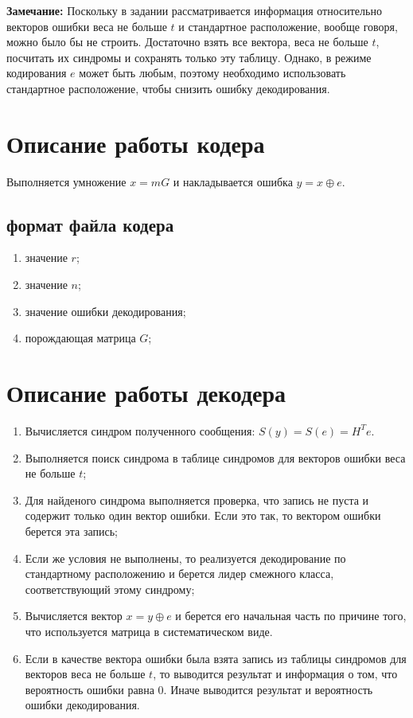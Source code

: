 \documentclass{article}
\begin{document}
\textbf{Замечание:}
Поскольку в задании рассматривается информация относительно векторов ошибки веса не больше $t$ и стандартное расположение, вообще говоря, можно было бы не строить.
Достаточно взять все вектора, веса не больше $t$, посчитать их синдромы и сохранять только эту таблицу.
Однако, в режиме кодирования $e$ может быть любым, поэтому необходимо использовать стандартное расположение, чтобы снизить ошибку декодирования.

\section{Описание работы кодера}

Выполняется умножение $x = mG$ и накладывается ошибка $y = x \oplus e$.

\subsection{формат файла кодера}

\begin{enumerate}
\item значение $r$;
\item значение $n$;
\item значение ошибки декодирования;
\item порождающая матрица $G$;
\end{enumerate}

\section{Описание работы декодера}

\begin{enumerate}
\item Вычисляется синдром полученного сообщения: $S(y) = S(e) = H^Te$.
\item Выполняется поиск синдрома в таблице синдромов для векторов ошибки веса не больше $t$;
\item Для найденого синдрома выполняется проверка, что запись не пуста и содержит только один вектор ошибки.
Если это так, то вектором ошибки берется эта запись;
\item Если же условия не выполнены, то реализуется декодирование по стандартному расположению и берется лидер смежного класса, соответствующий этому синдрому;
\item Вычисляется вектор $x = y \oplus e$ и берется его начальная часть по причине того, что используется матрица в систематическом виде.
\item Если в качестве вектора ошибки была взята запись из таблицы синдромов для векторов веса не больше $t$, то выводится результат и информация о том, что вероятность ошибки равна 0.
Иначе выводится результат и вероятность ошибки декодирования.
\end{enumerate}
\end{document}
